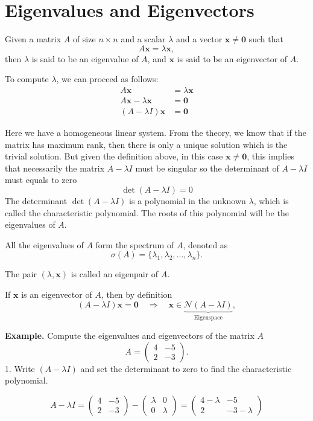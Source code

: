 \chapter{Eigenvalues and Eigenvectors}
Given a matrix \( A \) of size \( n \times n \) and a scalar \( \lambda \) and a vector \( \mathbf{x} \neq \mathbf{0} \) such that
\[
A\mathbf{x} = \lambda \mathbf{x},
\]
then \( \lambda \) is said to be an eigenvalue of \( A \), and \( \mathbf{x} \) is said to be an eigenvector of \( A \).

To compute \( \lambda \), we can proceed as follows:
\begin{align*}
A\mathbf{x} &= \lambda \mathbf{x} \\
A\mathbf{x} - \lambda \mathbf{x} &= \mathbf{0} \\
(A - \lambda I)\mathbf{x} &= \mathbf{0}
\end{align*}

Here we have a homogeneous linear system. From the theory, we know that if the matrix has maximum rank,
then there is only a unique solution which is the trivial solution. But given the definition above, in this
case \( \mathbf{x} \neq \mathbf{0} \), this implies that necessarily the matrix \( A - \lambda I \) must be
singular so the determinant of \( A - \lambda I \) must equals to zero
\[
\det(A - \lambda I) = 0
\]
The determinant \( \det(A - \lambda I) \) is a polynomial in the unknown \( \lambda \),
which is called the characteristic polynomial. The roots of this polynomial will be the
eigenvalues of \( A \).

All the eigenvalues of \( A \) form the spectrum of \( A \), denoted as 
\[
\sigma(A) = \{ \lambda_1, \lambda_2, \ldots, \lambda_n \}.
\]

The pair \( (\lambda, \mathbf{x}) \) is called an eigenpair of \( A \).

If \( \mathbf{x} \) is an eigenvector of \( A \), then by definition
\[
(A - \lambda I)\mathbf{x} = \mathbf{0} \quad \Rightarrow \quad \mathbf{x} \in \underbrace{\mathcal{N}(A - \lambda I)}_{\text{Eigenspace}},
\]

\textbf{Example.} Compute the eigenvalues and eigenvectors of the matrix $A$
\[
A = \begin{pmatrix}
4 & -5 \\
2 & -3
\end{pmatrix}.
\]
1. Write \((A - \lambda I)\) and set the determinant to zero to find the characteristic polynomial.

$$ A - \lambda I = \begin{pmatrix}
4 & -5 \\
2 & -3
\end{pmatrix} - \begin{pmatrix}
\lambda & 0 \\
0 & \lambda
\end{pmatrix} = \begin{pmatrix}
4 - \lambda & -5 \\
2 & -3 - \lambda
\end{pmatrix} $$


